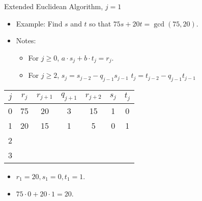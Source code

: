 \documentclass{beamer}
\begin{document}
\begin{frame}{Extended Euclidean Algorithm, $j=1$}

\begin{itemize}
  \item Example: Find $s$ and $t$ so that $75s+20t = \gcd(75, 20)$.
  \item Notes:
  \begin{itemize}
    \item For $j\geq0$, $a \cdot s_j + b \cdot t_j = r_j$.
    \item For $j\geq 2$, $s_j=s_{j-2} - q_{j-1}s_{j-1}$ \quad $t_j=t_{j-2} - q_{j-1}t_{j-1}$
  \end{itemize}
\end{itemize}

\vspace{1em}

\begin{tabular}{|c|c|c|c|c|c|c|}\hline
$j$   &  $r_{j}$    & $r_{j+1}$ & $q_{j+1}$ & $r_{j+2}$ & $s_j$ & $t_j$ \\ \hline\hline
0     &  75         &  20       &    3      &   15      &  1    &   0   \\ \hline
1     &  20         &  15       &    1      &    5      &  0    &   1   \\ \hline
2     &             &           &           &           &       &       \\ \hline
3     &             &           &           &           &       &       \\ \hline
\end{tabular}

\vspace{1em}

\begin{itemize}
  \item $r_1 = 20, s_1=0, t_1=1$.
  \item $75\cdot 0 + 20 \cdot 1 = 20$.
\end{itemize}

\end{frame}
\end{document}
